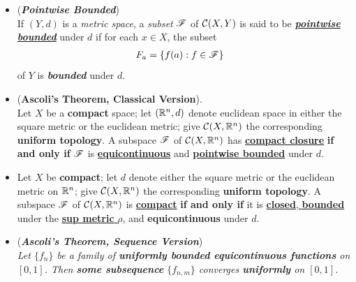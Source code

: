 \documentclass[11pt]{article}
\begin{document}
\begin{itemize}
\item \begin{definition} (\emph{\textbf{Pointwise Bounded}})\\
If $(Y, d)$ is a \emph{metric space}, a \emph{subset} ${\mathscr F}$ of ${\mathcal C}(X, Y)$ is said to be \underline{\emph{\textbf{pointwise bounded}}} under $d$ if for each $x \in X$, the subset
\begin{align*}
F_{a} &= \left\{f(a): f\in {\mathscr F}\right\}
\end{align*}
of $Y$ is \emph{\textbf{bounded}} under $d$.
\end{definition}

\item \begin{theorem} (\textbf{Ascoli’s Theorem, Classical Version}). \citep{munkres2000topology}\\
Let $X$ be a \textbf{compact} space; let $({\mathbb R}^n , d)$ denote euclidean space in either the square metric or the euclidean metric; give ${\mathcal C}(X, {\mathbb R}^n)$ the corresponding \textbf{uniform topology}. A subspace ${\mathscr F}$ of ${\mathcal C}(X, {\mathbb R}^n)$ has \underline{\textbf{compact closure}} \textbf{if and only if} ${\mathscr F}$ is \underline{\textbf{equicontinuous}} and \underline{\textbf{pointwise bounded}} under $d$.
\end{theorem}



\item \begin{corollary}
Let $X$  be  \textbf{compact}; let $d$ denote either the square metric or the euclidean metric on ${\mathbb R}^n$; give ${\mathcal C}(X, {\mathbb R}^n)$ the corresponding \textbf{uniform topology}. A subspace ${\mathscr F}$ of ${\mathcal C}(X, {\mathbb R}^n)$ is \underline{\textbf{compact}} \textbf{if and only if} it is \underline{\textbf{closed}, \textbf{bounded}} under the \underline{\textbf{sup metric} $\rho$}, and \textbf{equicontinuous} under $d$.
\end{corollary}

\item \begin{remark} (\textbf{\emph{Ascoli's Theorem, Sequence Version}}) \citep{reed1980methods}\\
\emph{Let $\{f_n\}$ be a family of \textbf{uniformly bounded equicontinuous functions} on $[0, 1]$. Then \textbf{some subsequence} $\{f_{n,m}\}$ converges \textbf{uniformly} on $[0, 1]$.}
\end{remark}
\end{itemize}
\end{document}
